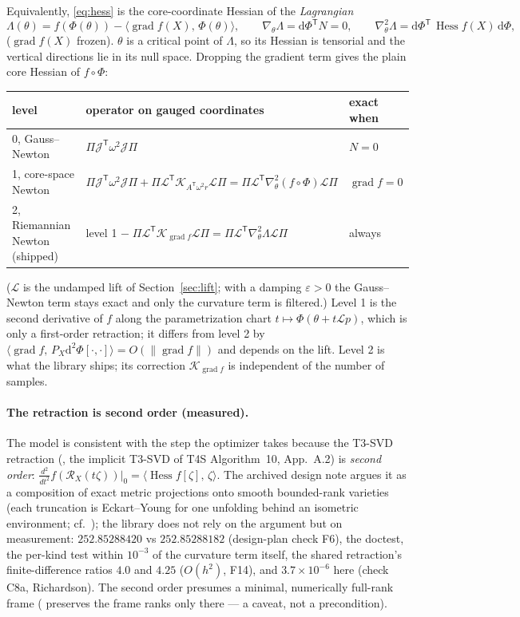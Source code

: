 \documentclass[11pt]{article}
\newcommand{\Lift}{\mathcal{L}}
\newcommand{\Jac}{\mathcal{J}}
\newcommand{\K}{\mathcal{K}}
\newcommand{\grad}{\operatorname{grad}}
\newcommand{\Hess}{\operatorname{Hess}}
\newcommand{\T}{\mathsf{T}}
\newcommand{\ip}[2]{\langle #1,\, #2\rangle}
\renewcommand{\th}{\theta}
\newcommand{\eps}{\varepsilon}
\theoremstyle{definition}
\theoremstyle{plain}
\begin{document}
Equivalently, \eqref{eq:hess} is the core-coordinate Hessian of the \emph{Lagrangian}
\begin{equation}
  \label{eq:lagrangian}
  \Lambda(\th) = f(\Phi(\th)) - \ip{\grad f(X)}{\Phi(\th)}, \qquad
  \nabla_\th\Lambda = \mathrm d\Phi^\T N = 0,\qquad
  \nabla^2_\th\Lambda = \mathrm d\Phi^\T\,\Hess f(X)\,\mathrm d\Phi,
\end{equation}
($\grad f(X)$ frozen). $\th$ is a critical point of $\Lambda$, so its Hessian is tensorial and the vertical
directions lie in its null space. Dropping the gradient term gives the plain core Hessian of $f\circ\Phi$:
\begin{center}
\small
\begin{tabular}{@{}lll@{}}
\toprule
level & operator on gauged coordinates & exact when \\
\midrule
0, Gauss--Newton & $\Pi\Jac^\T\omega^2\Jac\Pi$ & $N=0$ \\
1, core-space Newton & $\Pi\Jac^\T\omega^2\Jac\Pi+\Pi\Lift^\T\K_{A^\T\omega^2r}\Lift\Pi
   =\Pi\Lift^\T\nabla^2_\th(f\circ\Phi)\Lift\Pi$ & $\grad f=0$ \\
2, Riemannian Newton (shipped) & level 1 $-\;\Pi\Lift^\T\K_{\grad f}\Lift\Pi=\Pi\Lift^\T\nabla^2_\th\Lambda\Lift\Pi$
   & always \\
\bottomrule
\end{tabular}
\end{center}
($\Lift$ is the undamped lift of Section~\ref{sec:lift}; with a damping $\eps>0$ the Gauss--Newton term stays
exact and only the curvature term is filtered.) Level 1 is the second derivative of $f$ along the parametrization
chart $t\mapsto\Phi(\th+t\Lift p)$, which is only a first-order retraction; it differs from level 2 by
$\ip{\grad f}{P_X\mathrm d^2\Phi[\cdot,\cdot]}=O(\|\grad f\|)$ and depends on the lift. Level 2 is what the library ships;
its correction $\K_{\grad f}$ is independent of the number of samples.

\paragraph{The retraction is second order (measured).} The model is consistent with the step the optimizer takes
because the T3-SVD retraction (, the implicit T3-SVD of T4S Algorithm~10, App.~A.2) is
\emph{second order}: $\frac{d^2}{dt^2}f(\mathcal{R}_X(t\zeta))|_0=\ip{\Hess f[\zeta]}{\zeta}$. The archived design note
argues it as a composition of exact metric projections onto smooth bounded-rank varieties (each truncation is
Eckart--Young for one unfolding behind an isometric environment; cf.\ \cite{AM12}); the library does not rely on
the argument but on measurement: $252.85288420$ vs $252.85288182$ (design-plan check F6), the
 doctest, the per-kind test within $10^{-3}$ of the curvature term itself, the shared
retraction's finite-difference ratios $4.0$ and $4.25$ ($O(h^2)$, F14), and $3.7\times10^{-6}$ here (check C8a,
Richardson). The second order presumes a minimal, numerically full-rank frame ( preserves the frame
ranks only there --- a caveat, not a precondition).
\end{document}
